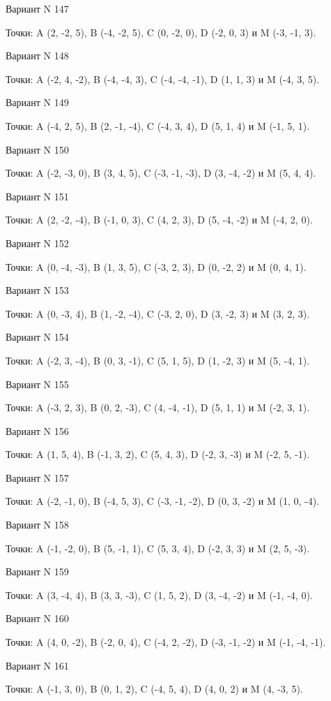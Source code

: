 \documentclass[11pt]{report}
\begin{document}
Вариант N 147

Точки: A (2, -2, 5), B (-4, -2, 5), C (0, -2, 0), D (-2, 0, 3) и M (-3, -1, 3).

Вариант N 148

Точки: A (-2, 4, -2), B (-4, -4, 3), C (-4, -4, -1), D (1, 1, 3) и M (-4, 3, 5).

Вариант N 149

Точки: A (-4, 2, 5), B (2, -1, -4), C (-4, 3, 4), D (5, 1, 4) и M (-1, 5, 1).
\newpage


Вариант N 150

Точки: A (-2, -3, 0), B (3, 4, 5), C (-3, -1, -3), D (3, -4, -2) и M (5, 4, 4).

Вариант N 151

Точки: A (2, -2, -4), B (-1, 0, 3), C (4, 2, 3), D (5, -4, -2) и M (-4, 2, 0).

Вариант N 152

Точки: A (0, -4, -3), B (1, 3, 5), C (-3, 2, 3), D (0, -2, 2) и M (0, 4, 1).

Вариант N 153

Точки: A (0, -3, 4), B (1, -2, -4), C (-3, 2, 0), D (3, -2, 3) и M (3, 2, 3).

Вариант N 154

Точки: A (-2, 3, -4), B (0, 3, -1), C (5, 1, 5), D (1, -2, 3) и M (5, -4, 1).

Вариант N 155

Точки: A (-3, 2, 3), B (0, 2, -3), C (4, -4, -1), D (5, 1, 1) и M (-2, 3, 1).

Вариант N 156

Точки: A (1, 5, 4), B (-1, 3, 2), C (5, 4, 3), D (-2, 3, -3) и M (-2, 5, -1).

Вариант N 157

Точки: A (-2, -1, 0), B (-4, 5, 3), C (-3, -1, -2), D (0, 3, -2) и M (1, 0, -4).

Вариант N 158

Точки: A (-1, -2, 0), B (5, -1, 1), C (5, 3, 4), D (-2, 3, 3) и M (2, 5, -3).

Вариант N 159

Точки: A (3, -4, 4), B (3, 3, -3), C (1, 5, 2), D (3, -4, -2) и M (-1, -4, 0).

Вариант N 160

Точки: A (4, 0, -2), B (-2, 0, 4), C (-4, 2, -2), D (-3, -1, -2) и M (-1, -4, -1).

Вариант N 161

Точки: A (-1, 3, 0), B (0, 1, 2), C (-4, 5, 4), D (4, 0, 2) и M (4, -3, 5).
\end{document}
